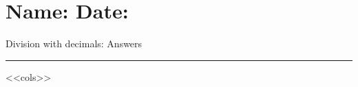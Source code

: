 \documentclass[leqno, 12pt]{article}
\def \HeadingAnswers {\section*{\Huge Name: \underline{\hspace{8cm}} \hfill Date: \underline{\hspace{3cm}}}
{Division with decimals: Answers} \vspace{1pt}\hrule}
\begin{document}
    \HeadingAnswers
    \vspace{-5mm}
    \begin{multicols}{2}
        <<cols>>
    \end{multicols}
\end{document}
